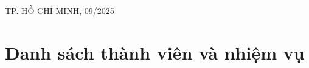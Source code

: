 \documentclass[a4paper]{article}
\begin{document}
\begin{titlepage}
	\begin{center}
		{\footnotesize TP. HỒ CHÍ MINH, 09/2025}
	\end{center}
\end{titlepage}

\pagebreak
\tableofcontents

\pagebreak

\pagebreak
\listoffigures
\listoftables
\pagebreak
{}

% 

\section*{Danh sách thành viên và nhiệm vụ}
\end{document}
